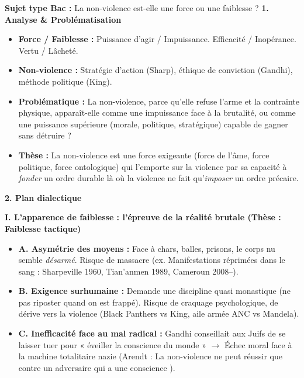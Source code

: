 \documentclass[11pt]{article}
\newcommand{\cle}[1]{{\popxbold\color{popdark}#1}}
\begin{document}
\begin{exoresolu}
\textbf{Sujet type Bac :} \guillemotleft La non-violence est-elle une force ou une faiblesse ? \guillemotright
\tcblower
\textbf{1. Analyse \& Problématisation}
\begin{itemize}
    \item \textbf{Force / Faiblesse :} Puissance d'agir / Impuissance. Efficacité / Inopérance. Vertu / Lâcheté.
    \item \textbf{Non-violence :} Stratégie d'action (Sharp), éthique de conviction (Gandhi), méthode politique (King).
    \item \textbf{Problématique :} La non-violence, parce qu'elle refuse l'arme et la contrainte physique, apparaît-elle comme une \cle{impuissance} face à la brutalité, ou comme une \cle{puissance supérieure} (morale, politique, stratégique) capable de gagner sans détruire ?
    \item \textbf{Thèse :} La non-violence est une \cle{force exigeante} (force de l'âme, force politique, force ontologique) qui l'emporte sur la violence par sa capacité à \emph{fonder} un ordre durable là où la violence ne fait qu'\emph{imposer} un ordre précaire.
\end{itemize}

\textbf{2. Plan dialectique}

\textbf{I. L'apparence de faiblesse : l'épreuve de la réalité brutale (Thèse : Faiblesse tactique)}
\begin{itemize}
    \item \textbf{A. Asymétrie des moyens :} Face à chars, balles, prisons, le corps nu semble \emph{désarmé}. Risque de massacre (ex. Manifestations réprimées dans le sang : \cle{Sharpeville} 1960, \cle{Tian'anmen} 1989, \cle{Cameroun 2008--}).
    \item \textbf{B. Exigence surhumaine :} Demande une \cle{discipline} quasi monastique (ne pas riposter quand on est frappé). Risque de \cle{craquage} psychologique, de dérive vers la violence (Black Panthers vs King, aile armée ANC vs Mandela).
    \item \textbf{C. Inefficacité face au mal radical :} Gandhi conseillait aux Juifs de se laisser tuer pour « éveiller la conscience du monde » $\rightarrow$ \cle{Échec moral} face à la machine totalitaire nazie (Arendt : \guillemotleft La non-violence ne peut réussir que contre un adversaire qui a une conscience \guillemotright).
\end{itemize}


\end{exoresolu}
\end{document}
